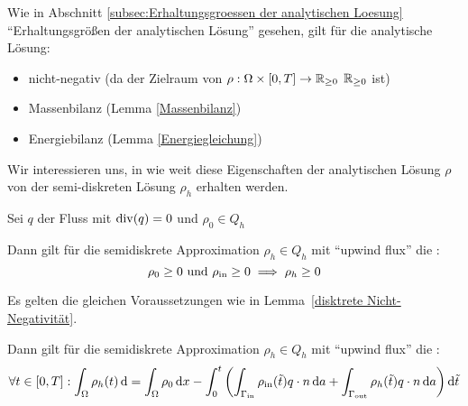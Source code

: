 \begin{repetition}
	Wie in Abschnitt \ref{subsec:Erhaltungsgroessen der analytischen Loesung} \enquote{Erhaltungsgrößen der analytischen Lösung} gesehen, gilt für die analytische Lösung:
	\begin{itemize}
		\item nicht-negativ (da der Zielraum von $ \rho: \Omega \times [0,T] \to \mathbb{R}_{\geq 0}$ $ \mathbb{R}_{\geq 0} $ ist)
		\item Massenbilanz (Lemma \ref{Massenbilanz})
		\item Energiebilanz (Lemma \ref{Energiegleichung})
	\end{itemize}
\end{repetition}

Wir interessieren uns, in wie weit diese Eigenschaften der analytischen Lösung $ \rho $ von der semi-diskreten Lösung $ \rho_h $ erhalten werden.


 
\begin{Lemma} \label{disktrete Nicht-Negativität}
		Sei $ q $ der Fluss mit $\operatorname{div}(q) = 0 $ und $ \rho_0 \in Q_h $ %
	
	Dann gilt für die semidiskrete Approximation $ \rho_h \in Q_h$ mit \enquote{upwind flux} die :
	\[ \rho_0 \geq 0 \text{ und } \rho_{\text{in}} \geq 0 \implies \rho_h \geq 0 \]
\end{Lemma}

\begin{Lemma} \label{diskrete Massenbilanz}
	Es gelten die gleichen Voraussetzungen wie in Lemma~\ref{disktrete Nicht-Negativität}.
	
	Dann gilt für die semidiskrete Approximation $ \rho_h \in Q_h$ mit \enquote{upwind flux} die :
	\[\forall t \in [0,T]: \int_\Omega \rho_h(t) \mathop{}\!\mathrm{d}   = \int_\Omega \rho_0 \mathop{}\!\mathrm{d} x - \int_{0}^{t} \left( \int_{\Gamma_{{\text{in}}}} \rho_{\text{in}}(\tilde{t}) q \cdot n \mathop{}\!\mathrm{d} a + \int_{\Gamma_{{\text{out}}}} \rho_h(\tilde{t}) q \cdot n \mathop{}\!\mathrm{d} a  \right) \mathop{}\!\mathrm{d} \tilde{t} \]
\end{Lemma}

